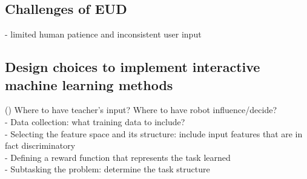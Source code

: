 \subsection{Challenges of EUD}
- limited human patience and inconsistent user input
 
 
\subsection{Design choices to implement interactive machine learning methods}
(\cite{chernova2014robot})
Where to have teacher's input? Where to have robot influence/decide?\\
- Data collection: what training data to include? \\
- Selecting the feature space and its structure: include input features that are in fact discriminatory \\
- Defining a reward function that represents the task learned \\
- Subtasking the problem: determine the task structure \\


